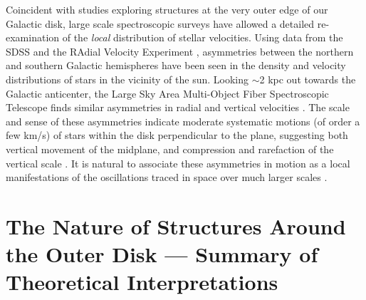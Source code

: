 \documentclass[galaxies,article,submit,moreauthors,pdftex,10pt,a4paper]{mdpi}
\begin{document}
Coincident with studies exploring structures at the very outer edge of our
Galactic disk, large scale spectroscopic surveys have allowed a detailed
re-examination of the {\it local} distribution of stellar velocities.
Using data from the SDSS \cite{widrow12,yanny13} and the RAdial Velocity
Experiment \cite[RAVE;][]{rave,williams13}, asymmetries between the northern and
southern Galactic hemispheres have been seen in the density and velocity
distributions of stars in the vicinity of the sun.
Looking $\sim$2 kpc out towards the Galactic anticenter, the Large Sky Area Multi-Object Fiber Spectroscopic Telescope \cite[LAMOST;][]{cui12,deng12,zhao12} finds similar asymmetries in radial and vertical velocities \cite{carlin13}.
The scale and sense of these asymmetries indicate moderate systematic motions (of order a few km/s) of stars within the disk perpendicular to the plane, suggesting both vertical movement of the midplane, and compression and rarefaction of the vertical scale \cite[referred to as ``bending'' and ``breathing'' modes respectively --- see, e.g.,][]{widrow14}.
It is natural to associate these asymmetries in motion as a local manifestations of the oscillations traced in space over much larger scales \cite{xu15,pricewhelan15}.


\section{The Nature of Structures Around the Outer Disk --- Summary of Theoretical Interpretations}
\label{sec:theory}



\end{document}
